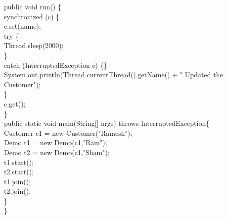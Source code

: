 \begin{flushleft}
\begin{itemize}
{			\s	public void run() \{ \\
			\s \s		synchronized (c) \{ \\
			\s \s \s			c.set(name); \\
			\s \s \s			try \{ \\
			\s \s \s				Thread.sleep(2000); \\
			\s \s \s			\} \\
			\s \s \s			catch (InterruptedException e) \{\} \\
			\s			System.out.println(Thread.currentThread().getName() + " Updated the Customer"); \\
			\s \s 		\} \\
			\s	\s	c.get(); \\
			\s	\} \\
			\s	public static void main(String[] args)  throws InterruptedException\{  \\
			\s \s		Customer c1 = new Customer("Ramesh"); \\
			\s \s		Demo t1 = new Demo(c1,"Ram"); \\
			\s \s		Demo t2 = new Demo(c1,"Sham"); \\
			\s \s		t1.start(); \\
			\s \s		t2.start(); \\
			\s \s		t1.join(); \\
			\s \s		t2.join(); \\
			\s	\} \\
			\}
		}
		\bigskip
	

\end{itemize}
\end{flushleft}
